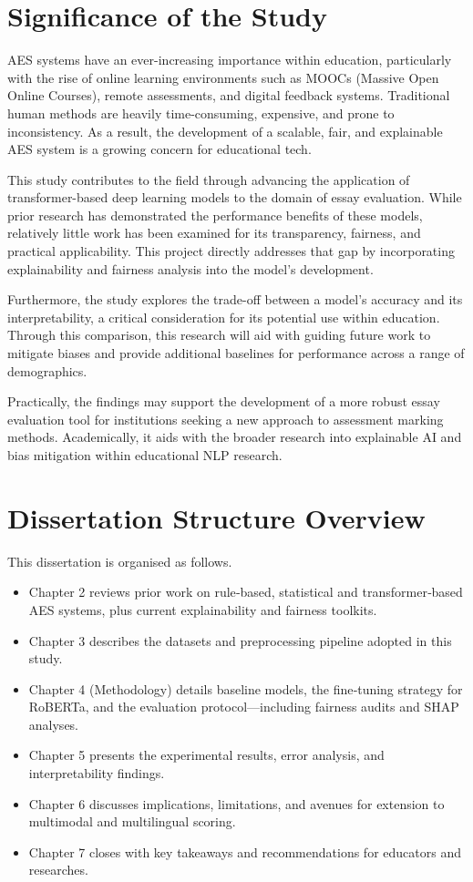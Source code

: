 \documentclass[12pt,a4paper]{report}
\begin{document}
\section{Significance of the Study}
AES systems have an ever-increasing importance within education, particularly with the rise of online learning environments such as MOOCs (Massive Open Online Courses), remote assessments, and digital feedback systems. Traditional human methods are heavily time-consuming, expensive, and prone to inconsistency. As a result, the development of a scalable, fair, and explainable AES system is a growing concern for educational tech.

This study contributes to the field through advancing the application of transformer-based deep learning models to the domain of essay evaluation. While prior research has demonstrated the performance benefits of these models, relatively little work has been examined for its transparency, fairness, and practical applicability. This project directly addresses that gap by incorporating explainability and fairness analysis into the model’s development.

Furthermore, the study explores the trade-off between a model’s accuracy and its interpretability, a critical consideration for its potential use within education. Through this comparison, this research will aid with guiding future work to mitigate biases and provide additional baselines for performance across a range of demographics.

Practically, the findings may support the development of a more robust essay evaluation tool for institutions seeking a new approach to assessment marking methods. Academically, it aids with the broader research into explainable AI and bias mitigation within educational NLP research.

\section{Dissertation Structure Overview}

This dissertation is organised as follows.
\begin{itemize}
    \item Chapter 2 reviews prior work on rule‑based, statistical and transformer‑based AES systems, plus current explainability and fairness toolkits.
    \item Chapter 3 describes the datasets and preprocessing pipeline adopted in this study.  
    \item Chapter 4 (Methodology) details baseline models, the fine‑tuning strategy for RoBERTa, and the evaluation protocol—including fairness audits and SHAP analyses. 
    \item Chapter 5 presents the experimental results, error analysis, and interpretability findings.  
    \item Chapter 6 discusses implications, limitations, and avenues for extension to multimodal and multilingual scoring.  
    \item Chapter 7 closes with key takeaways and recommendations for educators and researches.
\end{itemize}
\end{document}
